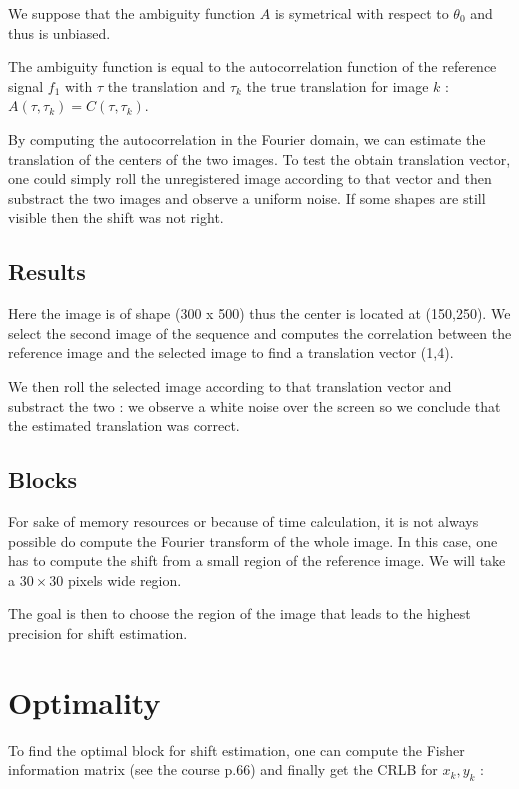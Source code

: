 We suppose that the ambiguity function $A$ is symetrical with respect to $\theta_0$ and thus is unbiased.

The ambiguity function is equal to the autocorrelation function of the reference signal $f_1$ with $\tau$ the translation and $\tau_k$ the true translation for image $k$ : $ A(\tau, \tau_k) = C(\tau, \tau_k) $. 

By computing the autocorrelation in the Fourier domain, we can estimate the translation of the centers of the two images. To test the obtain translation vector, one could simply roll the unregistered image according to that vector and then substract the two images and observe a uniform noise. If some shapes are still visible then the shift was not right.

\subsection{Results}
Here the image is of shape (300 x 500) thus the center is located at (150,250). We select the second image of the sequence and computes the correlation between the reference image and the selected image to find a translation vector (1,4).



We then roll the selected image according to that translation vector and substract the two : we observe a white noise over the screen so we conclude that the estimated translation was correct.


\subsection{Blocks}
For sake of memory resources or because of time calculation, it is not always possible do compute the Fourier transform of the whole image. In this case, one has to compute the shift from a small region of the reference image. We will take a $30 \times 30$ pixels wide region.

The goal is then to choose the region of the image that leads to the highest precision for shift estimation.




\section{Optimality}
To find the optimal block for shift estimation, one can compute the Fisher information matrix (see the course p.66) and finally get the CRLB for $x_k, y_k$ :


